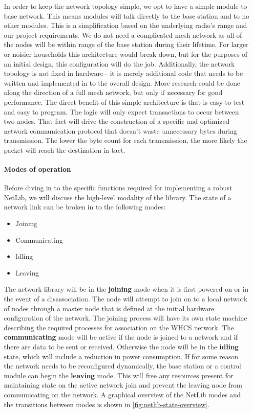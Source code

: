 In order to keep the network topology simple, we opt to have a simple module to
base network. This means modules will talk directly to the base station and to
no other modules. This is a simplification based on the underlying radio's
range and our project requirements. We do not need a complicated mesh network
as all of the nodes will be within range of the base station during their
lifetime. For larger or noisier households this architecture would break down,
but for the purposes of an initial design, this configuration will do the job.
Additionally, the network topology is not fixed in hardware - it is merely
additional code that needs to be written and implemented in to the overall
design. More research could be done along the direction of a full mesh network,
but only if necessary for good performance. The direct benefit of this simple
architecture is that is easy to test and easy to program. The logic will only
expect transactions to occur between two nodes. That fact will drive the
construction of a specific and optimized network communication protocol that
doesn't waste unnecessary bytes during transmission. The lower the byte count
for each transmission, the more likely the packet will reach the destination in
tact.

\paragraph{Modes of operation}
Before diving in to the specific functions required for implementing a robust
NetLib, we will discuss the high-level modality of the library. The state of a
network link can be broken in to the following modes:

\begin{itemize}
  \item Joining
  \item Communicating
  \item Idling
  \item Leaving
\end{itemize}

The network library will be in the \textbf{joining} mode when it is first
powered on or in the event of a disassociation. The node will attempt to join
on to a local network of nodes through a master node that is defined at the
initial hardware configuration of the network. The joining process will have
its own state machine describing the required processes for association on the
WHCS network. The \textbf{communicating} mode will be active if the node is
joined to a network and if there are data to be sent or received. Otherwise the
node will be in the \textbf{idling} state, which will include a reduction in
power consumption. If for some reason the network needs to be reconfigured
dynamically, the base station or a control module can begin the
\textbf{leaving} mode. This will free any resources present for maintaining
state on the active network join and prevent the leaving node from
communicating on the network. A graphical overview of the NetLib modes and the
transitions between modes is shown in \autoref{fig:netlib-state-overview}.

